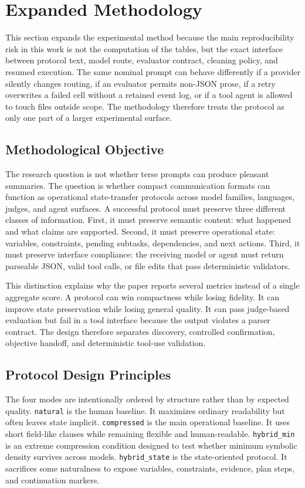 \documentclass[11pt]{article}
\begin{document}
\section{Expanded Methodology}
\label{sec:expanded_methodology}
This section expands the experimental method because the main reproducibility risk in this work is not the computation of the tables, but the exact interface between protocol text, model route, evaluator contract, cleaning policy, and resumed execution. The same nominal prompt can behave differently if a provider silently changes routing, if an evaluator permits non-JSON prose, if a retry overwrites a failed cell without a retained event log, or if a tool agent is allowed to touch files outside scope. The methodology therefore treats the protocol as only one part of a larger experimental surface.

\subsection{Methodological Objective}
The research question is not whether terse prompts can produce pleasant summaries. The question is whether compact communication formats can function as operational state-transfer protocols across model families, languages, judges, and agent surfaces. A successful protocol must preserve three different classes of information. First, it must preserve semantic content: what happened and what claims are supported. Second, it must preserve operational state: variables, constraints, pending subtasks, dependencies, and next actions. Third, it must preserve interface compliance: the receiving model or agent must return parseable JSON, valid tool calls, or file edits that pass deterministic validators.

This distinction explains why the paper reports several metrics instead of a single aggregate score. A protocol can win compactness while losing fidelity. It can improve state preservation while losing general quality. It can pass judge-based evaluation but fail in a tool interface because the output violates a parser contract. The design therefore separates discovery, controlled confirmation, objective handoff, and deterministic tool-use validation.

\subsection{Protocol Design Principles}
The four modes are intentionally ordered by structure rather than by expected quality. \texttt{natural} is the human baseline. It maximizes ordinary readability but often leaves state implicit. \texttt{compressed} is the main operational baseline. It uses short field-like clauses while remaining flexible and human-readable. \texttt{hybrid\_min} is an extreme compression condition designed to test whether minimum symbolic density survives across models. \texttt{hybrid\_state} is the state-oriented protocol. It sacrifices some naturalness to expose variables, constraints, evidence, plan steps, and continuation markers.
\end{document}
